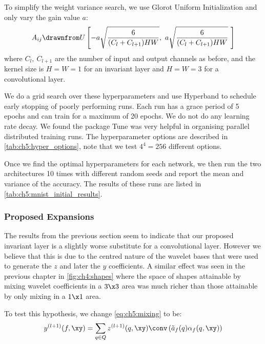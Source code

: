 To simplify the weight variance search, we use Glorot Uniform Initialization
\cite{glorot_understanding_2010} and only vary the gain value $a$:
%
\begin{equation}
  A_{ij} \drawnfrom U\left[ -a\sqrt{\frac{6}{(C_l + C_{l+1})HW}},\ a\sqrt{\frac{6}{(C_l + C_{l+1})HW}}\
  \right] \label{eq:ch5:glorot}
\end{equation}
%
where $C_l,\ C_{l+1}$ are the number of input and output channels as before, and
the kernel size is $H = W = 1$ for an invariant layer and $H = W= 3$ for a
convolutional layer.

We do a grid search over these hyperparameters and use Hyperband
\cite{li_hyperband:_2016} to schedule early stopping of poorly performing runs.
Each run has a grace period of 5 epochs and can train for a maximum of 20
epochs. We do not do any learning rate decay.  We found the package Tune
\cite{liaw2018tune} was very helpful in organising parallel distributed training
runs.  
The hyperparameter options are described in
\autoref{tab:ch5:hyper_options}, note that we test $4^4=256$ different options.

Once we find the optimal hyperparameters for each network, we then run the two
architectures 10 times with different random seeds and report the mean and variance of
the accuracy. The results of these runs are listed in
\autoref{tab:ch5:mnist_initial_results}.





\subsubsection{Proposed Expansions}\label{sec:ch5:mnist_newlayer}
The results from the previous section seem to indicate that our proposed
invariant layer is a slightly worse substitute for a convolutional layer.
However we believe that this is due to the centred nature of the wavelet bases
that were used to generate the $z$ and later the $y$ coefficients. A similar
effect was seen in the previous chapter in \autoref{fig:ch4:shapes} where the
space of shapes attainable by mixing wavelet coefficients in a $3\x 3$ area was
much richer than those attainable by only mixing in a $1\x 1$ area. 

To test this hypothesis, we change \autoref{eq:ch5:mixing} to be:
\begin{equation}
  y^{(l+1)}(f, \xy)  =  \sum_{q \in Q} z^{(l+1)}(q, \xy) \conv \left(\tilde{a}_f(q) \alpha_f(q, \xy) \right)
\end{equation}

